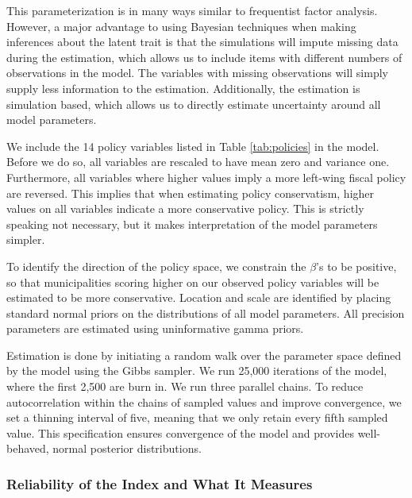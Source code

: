 \documentclass[a4paper,12pt]{article}
\begin{document}
This parameterization is in many ways similar to frequentist factor analysis. However, a major advantage to using Bayesian techniques when making inferences about the latent trait is that the simulations will impute missing data during the estimation, which allows us to include items with different numbers of observations in the model. The variables with missing observations will simply supply less information to the estimation. Additionally, the estimation is simulation based, which allows us to directly estimate uncertainty around all model parameters. 

We include the 14 policy variables listed in Table  \ref{tab:policies} in the model. Before we do so, all variables are rescaled to have mean zero and variance one. Furthermore, all variables where higher values imply a more left-wing fiscal policy are reversed. This implies that when estimating policy conservatism, higher values on all variables indicate a more conservative policy. This is strictly speaking not necessary, but it makes interpretation of the model parameters simpler.

To identify the direction of the policy space, we constrain the $\beta$'s to be positive, so that municipalities scoring higher on our observed policy variables will be estimated to be more conservative. Location and scale are identified by placing standard normal priors on the distributions of all model parameters. All precision parameters are estimated using uninformative gamma priors.

Estimation is done by initiating a random walk over the parameter space defined by the model using the Gibbs sampler. We run 25,000 iterations of the model, where the first 2,500 are burn in. We run three parallel chains. To reduce autocorrelation within the chains of sampled values and improve convergence, we set a thinning interval of five, meaning that we only retain every fifth sampled value. This specification ensures  convergence of the model and provides well-behaved, normal posterior distributions.

\subsubsection*{Reliability of the Index and What It Measures}
\end{document}
